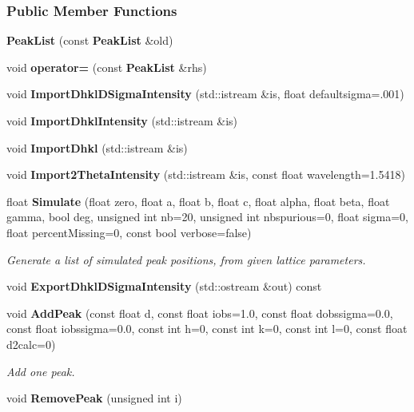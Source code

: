 \subsubsection*{Public Member Functions}
\begin{DoxyCompactItemize}
\item 
{\bfseries PeakList} (const {\bf PeakList} \&old)\label{a00059_a61c463b62f2ef45451dc873e2903e9c8}

\item 
void {\bfseries operator=} (const {\bf PeakList} \&rhs)\label{a00059_a47e535574bdbcf7017b24b5154cf6251}

\item 
void {\bfseries ImportDhklDSigmaIntensity} (std::istream \&is, float defaultsigma=.001)\label{a00059_ac4373f4302ba0767cc957e64da9d9c00}

\item 
void {\bfseries ImportDhklIntensity} (std::istream \&is)\label{a00059_a10fba158184bcfd1b19a7ec524641123}

\item 
void {\bfseries ImportDhkl} (std::istream \&is)\label{a00059_a50cad4f19639264f93f153775824dcdd}

\item 
void {\bfseries Import2ThetaIntensity} (std::istream \&is, const float wavelength=1.5418)\label{a00059_a84f1e73d15c57b5e0cabd543b1b340c4}

\item 
float {\bf Simulate} (float zero, float a, float b, float c, float alpha, float beta, float gamma, bool deg, unsigned int nb=20, unsigned int nbspurious=0, float sigma=0, float percentMissing=0, const bool verbose=false)
\begin{DoxyCompactList}\small\item\em Generate a list of simulated peak positions, from given lattice parameters. \item\end{DoxyCompactList}\item 
void {\bfseries ExportDhklDSigmaIntensity} (std::ostream \&out) const \label{a00059_acb479606e89d9b6c4ec830d491d56ea6}

\item 
void {\bf AddPeak} (const float d, const float iobs=1.0, const float dobssigma=0.0, const float iobssigma=0.0, const int h=0, const int k=0, const int l=0, const float d2calc=0)
\begin{DoxyCompactList}\small\item\em Add one peak. \item\end{DoxyCompactList}\item 
void {\bfseries RemovePeak} (unsigned int i)\label{a00059_a1b87305d81488c71ea877c9ccf182cc4}


\end{DoxyCompactItemize}
